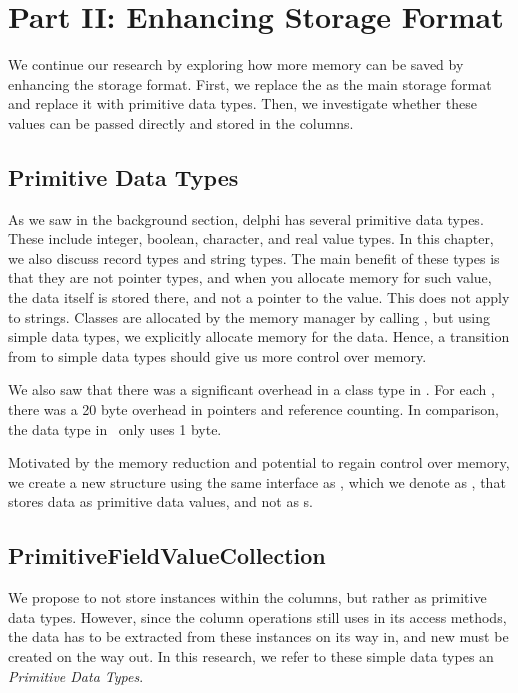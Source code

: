 \chapter{Part II: Enhancing Storage Format}
\label{chap:storage-format}
We continue our research by exploring how more memory can be saved by enhancing the storage format. First, we replace the  as the main storage format and replace it with primitive data types. Then, we investigate whether these values can be passed directly and stored in the columns.

\clearpage

\section{Primitive Data Types}
\label{sec:Simple Data Types}
As we saw in the background section, delphi has several primitive data types. These include integer, boolean, character, and real value types. In this chapter, we also discuss record types and string types. The main benefit of these types is that they are not pointer types, and when you allocate memory for such value, the data itself is stored there, and not a pointer to the value. This does not apply to strings. Classes are allocated by the memory manager by calling , but using simple data types, we explicitly allocate memory for the data. Hence, a transition from  to simple data types should give us more control over memory.

We also saw that there was a significant overhead in a class type in \delphi. For each , there was a 20 byte overhead in pointers and reference counting. In comparison, the  data type in \delphi~only uses 1 byte.

Motivated by the memory reduction and potential to regain control over memory, we create a new structure using the same interface as , which we denote as , that stores data as primitive data values, and not as s.

\section{PrimitiveFieldValueCollection}
\label{sec:PrimitiveFieldValueCollection}
We propose to not store  instances within the columns, but rather as primitive data types. However, since the column operations still uses  in its access methods, the data has to be extracted from these instances on its way in, and new  must be created on the way out. In this research, we refer to these simple data types an \textit{Primitive Data Types}.


